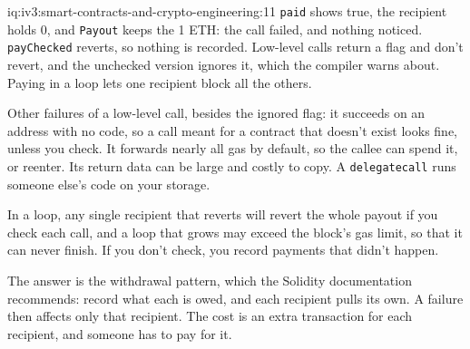 \begin{solution}{iq:iv3:smart-contracts-and-crypto-engineering:11}
\texttt{paid} shows true, the recipient holds 0, and \texttt{Payout} keeps the 1 ETH: the call failed, and nothing noticed. \texttt{payChecked} reverts, so nothing is recorded. Low-level calls return a flag and don't revert, and the unchecked version ignores it, which the compiler warns about. Paying in a loop lets one recipient block all the others.

Other failures of a low-level call, besides the ignored flag: it succeeds on an address with no code, so a call meant for a contract that doesn't exist looks fine, unless you check. It forwards nearly all gas by default, so the callee can spend it, or reenter. Its return data can be large and costly to copy. A \texttt{delegatecall} runs someone else's code on your storage.

In a loop, any single recipient that reverts will revert the whole payout if you check each call, and a loop that grows may exceed the block's gas limit, so that it can never finish. If you don't check, you record payments that didn't happen.

The answer is the withdrawal pattern, which the Solidity documentation recommends: record what each is owed, and each recipient pulls its own. A failure then affects only that recipient. The cost is an extra transaction for each recipient, and someone has to pay for it.

\end{solution}

